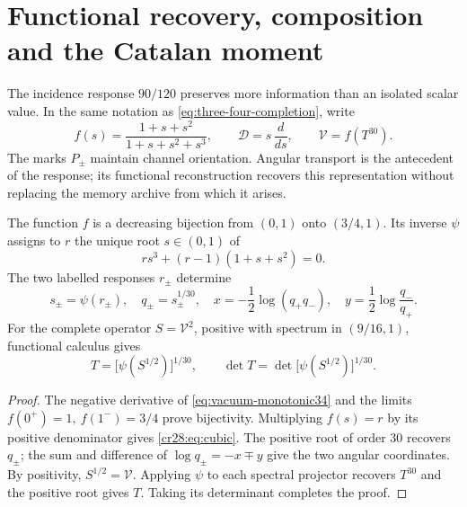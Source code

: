 \section{Functional recovery, composition and the Catalan moment}
\label{cr28:sec:restitucion-constitutiva}

The incidence response \(90/120\) preserves more information than an isolated scalar value. In the same notation as \eqref{eq:three-four-completion}, write
\[
 f(s)=\frac{1+s+s^2}{1+s+s^2+s^3},\qquad
 \mathcal D=s\,\frac{d}{ds},\qquad
 \mathcal V=f(T^{30}).
\]
The marks \(P_\pm\) maintain channel orientation. Angular transport is the antecedent of the response; its functional reconstruction recovers this representation without replacing the memory archive from which it arises.

\begin{theorem}
\label{cr28:thm:inversion-constitutiva} The function \(f\) is a decreasing bijection from \((0,1)\) onto \((3/4,1)\). Its inverse \(\psi\) assigns to \(r\) the unique root \(s\in(0,1)\) of
\begin{equation}
 r s^3+(r-1)(1+s+s^2)=0.
 \label{cr28:eq:cubic}
\end{equation}
The two labelled responses \(r_\pm\) determine
\begin{equation}
 s_\pm=\psi(r_\pm),\quad q_\pm=s_\pm^{1/30},\quad
 x=-\frac12\log(q_+q_-),\quad
 y=\frac12\log\frac{q_-}{q_+}.
 \label{cr28:eq:angular-recovery}
\end{equation}
For the complete operator \(S=\mathcal V^2\), positive with spectrum in \((9/16,1)\), functional calculus gives
\begin{equation}
 T=\bigl[\psi(S^{1/2})\bigr]^{1/30},\qquad
 \det T=\det\bigl[\psi(S^{1/2})\bigr]^{1/30}.
 \label{cr28:eq:operator-recovery}
\end{equation}
\end{theorem}
\begin{proof}
The negative derivative of \eqref{eq:vacuum-monotonic34} and the limits \(f(0^+)=1,\ f(1^-)=3/4\) prove bijectivity. Multiplying \(f(s)=r\) by its positive denominator gives \eqref{cr28:eq:cubic}. The positive root of order \(30\) recovers \(q_\pm\); the sum and difference of \(\log q_\pm=-x\mp y\) give the two angular coordinates. By positivity, \(S^{1/2}=\mathcal V\). Applying \(\psi\) to each spectral projector recovers \(T^{30}\) and the positive root gives \(T\). Taking its determinant completes the proof.
\end{proof}

